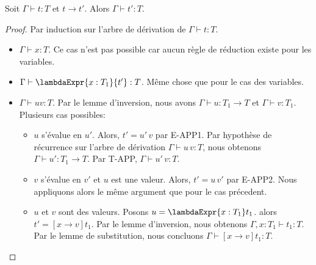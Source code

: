 \begin{theorem} 
  Soit $\Gamma \vdash t : T$ et $t \rightarrow t'$. Alors $\Gamma \vdash t' :
  T$.
\end{theorem}

\begin{proof}
  Par induction sur l'arbre de dérivation de $\Gamma \vdash t : T$.
  \begin{itemize}
  \item $\Gamma \vdash x : T$. Ce cas n'est pas possible car aucun règle de
    réduction existe pour les variables.
  \item $\Gamma \vdash \lambdaExpr{x : T_{1}}{t'} : T$. Même chose que pour le
    cas des variables.
  \item $\Gamma \vdash u v : T$. Par le lemme d'inversion, nous avons $\Gamma
    \vdash u : T_{1} \rightarrow T$ et $\Gamma \vdash v : T_{1}$. Plusieurs cas possibles:
    \begin{itemize}
    \item $u$ s'évalue en $u'$. Alors, $t' = u' \, v$ par E-APP1. Par hypothèse
      de récurrence sur l'arbre de dérivation $\Gamma \vdash u \, v : T$, nous
      obtenons $\Gamma \vdash u' : T_{1} \rightarrow T$. Par T-APP,
      $\Gamma \vdash u' \, v : T$.
    \item $v$ s'évalue en $v'$ et $u$ est une valeur. Alors, $t' = u \, v'$ par
      E-APP2. Nous appliquons alors le même argument que pour le cas précedent.
    \item $u$ et $v$ sont des valeurs. Posons $u = \lambdaExpr{x : T_{1}} t_{1}$.
      alors $t' = [x \rightarrow v]t_{1}$. Par le lemme d'inversion, nous
      obtenons $\Gamma, x : T_{1} \vdash t_{1} : T$. Par le lemme de
      substitution, nous concluons $\Gamma \vdash [x \rightarrow v]t_{1} : T$.
    \end{itemize}
  \end{itemize}
\end{proof}